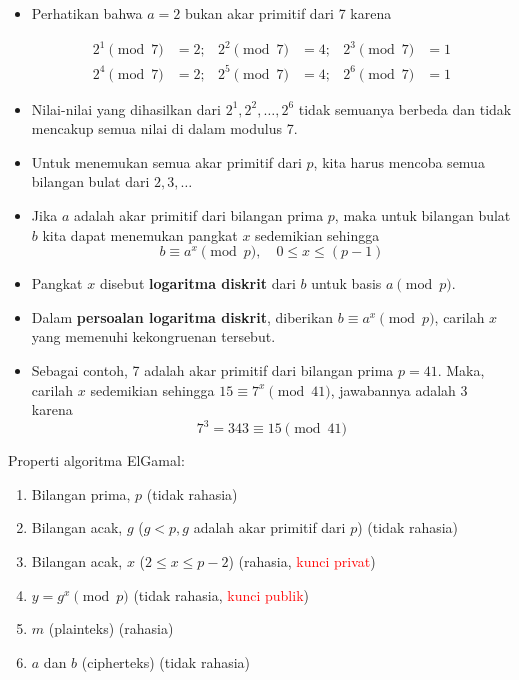 \documentclass{article}
\begin{document}
\begin{itemize}
    \item Perhatikan bahwa $a = 2$ bukan akar primitif dari 7 karena
    
    \[
    \begin{aligned}
    2^1 \pmod{7} &= 2; & 2^2 \pmod{7} &= 4; & 2^3 \pmod{7} &= 1 \\
    2^4 \pmod{7} &= 2; & 2^5 \pmod{7} &= 4; & 2^6 \pmod{7} &= 1
    \end{aligned}
    \]
    
    \item Nilai-nilai yang dihasilkan dari $2^1, 2^2, \dots, 2^6$ tidak semuanya berbeda dan tidak mencakup semua nilai di dalam modulus 7.
    
    \item Untuk menemukan semua akar primitif dari $p$, kita harus mencoba semua bilangan bulat dari $2, 3, \dots$
\end{itemize}

\newpage


\begin{itemize}
  \item Jika $a$ adalah akar primitif dari bilangan prima $p$, maka untuk bilangan bulat $b$ kita dapat menemukan pangkat $x$ sedemikian sehingga
  \[ b \equiv a^x \pmod{p}, \quad 0 \le x \le (p-1) \]
  \item Pangkat $x$ disebut \textbf{logaritma diskrit} dari $b$ untuk basis $a \pmod{p}$.
  \item Dalam \textbf{persoalan logaritma diskrit}, diberikan $b \equiv a^x \pmod{p}$, carilah $x$ yang memenuhi kekongruenan tersebut.
  \item Sebagai contoh, 7 adalah akar primitif dari bilangan prima $p = 41$. Maka, carilah $x$ sedemikian sehingga $15 \equiv 7^x \pmod{41}$, jawabannya adalah 3 karena
  \[ 7^3 = 343 \equiv 15 \pmod{41} \]
\end{itemize}

\newpage


Properti algoritma ElGamal:
\begin{enumerate}
  \item Bilangan prima, $p$ \hfill (tidak rahasia)
  \item Bilangan acak, $g$ ($g < p, g$ adalah akar primitif dari $p$) \hfill (tidak rahasia)
  \item Bilangan acak, $x$ ($2 \le x \le p - 2$) \hfill (rahasia, \textcolor{red}{kunci privat})
  \item $y = g^x \pmod{p}$ \hfill (tidak rahasia, \textcolor{red}{kunci publik})
  \item $m$ (plainteks) \hfill (rahasia)
  \item $a$ dan $b$ (cipherteks) \hfill (tidak rahasia)
\end{enumerate}
\end{document}
